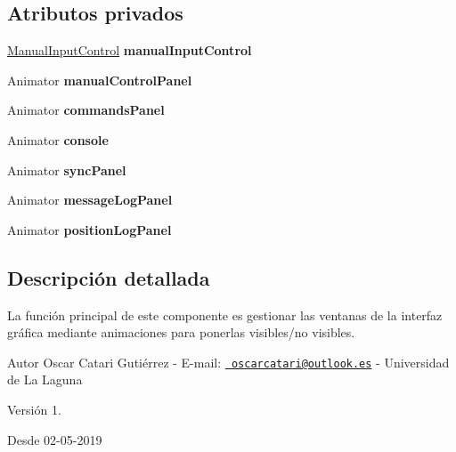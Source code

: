 \subsection*{Atributos privados}
\begin{DoxyCompactItemize}
\item 
\mbox{\label{class_panel_control_ac8c59ded2a6ef4f648a58582265b83be}} 
\mbox{\hyperlink{class_manual_input_control}{Manual\+Input\+Control}} {\bfseries manual\+Input\+Control}
\item 
\mbox{\label{class_panel_control_a1677195f4ad88a047d549ebbe634d713}} 
Animator {\bfseries manual\+Control\+Panel}
\item 
\mbox{\label{class_panel_control_affbc9e06d9bc16e095bbf67029c6959b}} 
Animator {\bfseries commands\+Panel}
\item 
\mbox{\label{class_panel_control_ace602f976c43c94c566275af3bbb616e}} 
Animator {\bfseries console}
\item 
\mbox{\label{class_panel_control_a8f296399aa653e2d120896f09e72760f}} 
Animator {\bfseries sync\+Panel}
\item 
\mbox{\label{class_panel_control_add908e440cb683e09aedd6a976133140}} 
Animator {\bfseries message\+Log\+Panel}
\item 
\mbox{\label{class_panel_control_a82471f542f9bbd18007cffd0a83cdd08}} 
Animator {\bfseries position\+Log\+Panel}
\end{DoxyCompactItemize}


\subsection{Descripción detallada}
La función principal de este componente es gestionar las ventanas de la interfaz gráfica mediante animaciones para ponerlas visibles/no visibles. \begin{DoxyAuthor}{Autor}
Oscar Catari Gutiérrez -\/ E-\/mail\+: \href{mailto:oscarcatari@outlook.es}{\texttt{ oscarcatari@outlook.\+es}} -\/ Universidad de La Laguna 
\end{DoxyAuthor}
\begin{DoxyVersion}{Versión}
1. 
\end{DoxyVersion}
\begin{DoxySince}{Desde}
02-\/05-\/2019 
\end{DoxySince}


